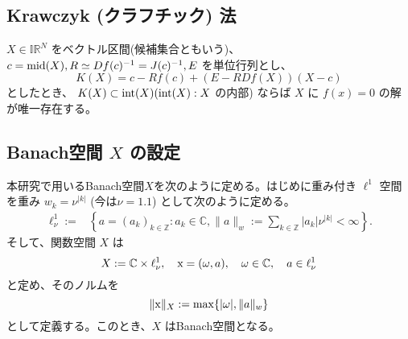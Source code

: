 \subsection{Krawczyk (クラフチック) 法}
\begin{thm}
$X \in \mathbb{IR}^N$ をベクトル区間(候補集合ともいう)、 $c = \mathop{\mathrm{mid}}(X), R \simeq Df(c)^{-1} = J(c)^{-1}, E$ を単位行列とし、
$$
    K(X) = c - Rf(c) + (E - RDf(X))(X-c)
$$
としたとき、 $K(X) \subset \mathop{\mathrm{int}}(X) (\mathop{\mathrm{int}}(X) : X$ の内部) ならば $X$ に $f(x) = 0$ の解が唯一存在する。
\end{thm}

\subsection{Banach空間 $X$ の設定}

本研究で用いるBanach空間$X$を次のように定める。はじめに重み付き $\ell^1$ 空間を重み $w_k=\nu^{|k|}$ (今は$\nu=1.1$) として次のように定める。
\footnotesize
\begin{align*}
\ell^1_\nu := &\left\{ a = (a_k)_{k \in \mathbb{Z}}: a_k \in \mathbb{C}, \| a \|_w := \sum_{k \in \mathbb{Z} }|a_k | \nu^{|k|} < \infty \right\}.
\end{align*}
\normalsize
そして、関数空間 $X$ は
$$
    X := \mathbb{C} \times \ell^1_{\nu}, \quad \mathrm x = (\omega, a), \quad \omega \in \mathbb{C}, \quad a \in \ell^1_\nu
$$
と定め、そのノルムを
$$
    \| \mathrm x \|_X := \max\{ |\omega|, \| a \|_w \}
$$
として定義する。このとき、$X$ はBanach空間となる。



%